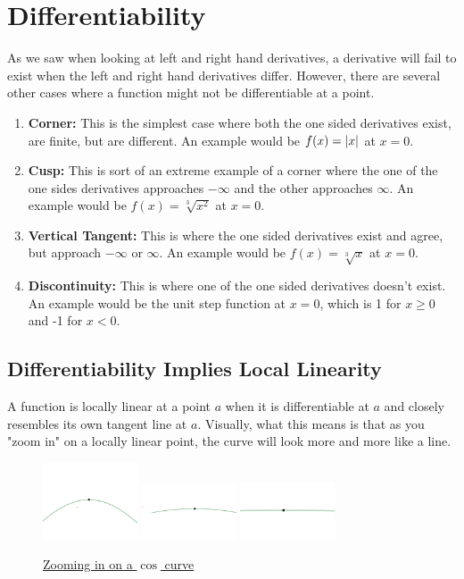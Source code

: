 \section{Differentiability}
As we saw when looking at left and right hand derivatives, a derivative will fail to exist when the left and right hand derivatives differ.
However, there are several other cases where a function might not be differentiable at a point.
\begin{enumerate}
	\item \textbf{Corner: } This is the simplest case where both the one sided derivatives exist, are finite, but are different.
		An example would be $f(x)=\lvert x \rvert$ at $x=0$.
	\item \textbf{Cusp: } This is sort of an extreme example of a corner where the one of the one sides derivatives approaches $-\infty$ and the other approaches $\infty$.
		An example would be $f(x)=\sqrt[3]{x^2}$ at $x=0$.
	\item \textbf{Vertical Tangent: } This is where the one sided derivatives exist and agree, but approach $-\infty$ or $\infty$.
		An example would be $f(x)=\sqrt[3]{x}$ at $x = 0$.
	\item \textbf{Discontinuity: } This is where one of the one sided derivatives doesn't exist.
		An example would be the unit step function at $x=0$, which is 1 for $x \geq 0$ and -1 for $x < 0$.
\end{enumerate}

\subsection{Differentiability Implies Local Linearity}
A function is locally linear at a point $a$ when it is differentiable at $a$ and closely resembles its own tangent line at $a$.
Visually, what this means is that as you "zoom in" on a locally linear point, the curve will look more and more like a line.

\begin{figure}[H]
	\label{locally_linear}
	\centering
	\includegraphics[width = 0.25\textwidth]{./derivatives/cos1.png}
	\includegraphics[width = 0.25\textwidth]{./derivatives/cos2.png}
	\includegraphics[width = 0.25\textwidth]{./derivatives/cos3.png}
	\caption{\hyperref{}{}{}{Zooming in on a $\cos$ curve}}
\end{figure}

